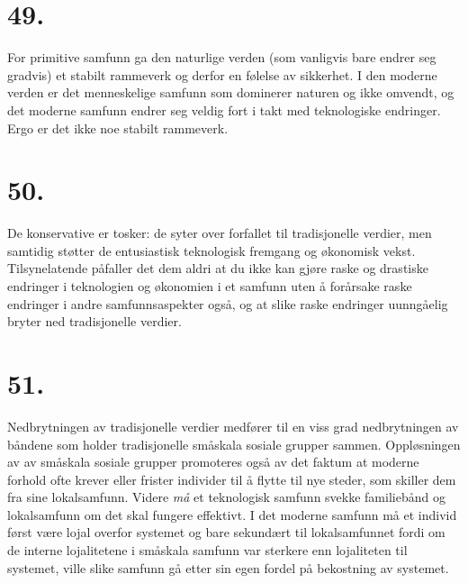 \documentclass[oneside]{book}
\begin{document}
\section*{49.}
For primitive samfunn ga den naturlige verden (som vanligvis bare endrer seg
gradvis) et stabilt rammeverk og derfor en følelse av sikkerhet. I den moderne
verden er det menneskelige samfunn som dominerer naturen og ikke omvendt, og
det moderne samfunn endrer seg veldig fort i takt med teknologiske endringer.
Ergo er det ikke noe stabilt rammeverk.

\section*{50.}
De konservative er tosker: de syter over forfallet til tradisjonelle verdier,
men samtidig støtter de entusiastisk teknologisk fremgang og økonomisk vekst.
Tilsynelatende påfaller det dem aldri at du ikke kan gjøre raske og drastiske
endringer i teknologien og økonomien i et samfunn uten å forårsake raske
endringer i andre samfunnsaspekter også, og at slike raske endringer uunngåelig
bryter ned tradisjonelle verdier.

\section*{51.}
Nedbrytningen av tradisjonelle verdier medfører til en viss grad nedbrytningen
av båndene som holder tradisjonelle småskala sosiale grupper sammen.
Oppløsningen av av småskala sosiale grupper promoteres også av det faktum at
moderne forhold ofte krever eller frister individer til å flytte til nye
steder, som skiller dem fra sine lokalsamfunn. Videre {\em må} et teknologisk
samfunn svekke familiebånd og lokalsamfunn om det skal fungere effektivt. I det
moderne samfunn må et individ først være lojal overfor systemet og bare
sekundært til lokalsamfunnet fordi om de interne lojalitetene i småskala
samfunn var sterkere enn lojaliteten til systemet, ville slike samfunn gå etter
sin egen fordel på bekostning av systemet. 
\end{document}
